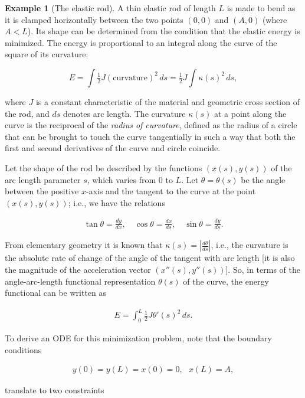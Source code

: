 \documentclass[11pt]{report}
\theoremstyle{plain}
\theoremstyle{definition}
\newtheorem{example}[thm]{Example}
\begin{document}
\begin{example}[The elastic rod]
A thin elastic rod of length $L$ is made to bend as it
is clamped horizontally between the two points $(0,0)$
and $(A,0)$ (where $A<L$). Its shape can be determined
from the condition that the elastic energy is
minimized. The energy is proportional to an integral
along the curve of the square of its curvature:

\[
E = \int \tfrac12 J (\textrm{curvature})^2\,ds = \tfrac12 J \int \kappa(s)^2 \,ds,
\]

\noindent where $J$ is a constant characteristic of the material
and geometric cross section of the rod, and $ds$
denotes arc length. The curvature $\kappa(s)$ at a
point along the curve is the reciprocal of the \emph{radius
of curvature}, defined as the radius of a circle that
can be brought to touch the curve tangentially in such
a way that both the first and second derivatives of
the curve and circle coincide.

Let the shape of the rod be described by the functions
$(x(s), y(s))$ of the arc length parameter $s$, which
varies from $0$ to $L$. Let $\theta=\theta(s)$ be the
angle between the positive $x$-axis and the tangent to
the curve at the point $(x(s),y(s))$; i.e., we have
the relations

\begin{align*}
\tan \theta = \frac{dy}{dx}, \quad \cos\theta = \frac{dx}{ds}, \quad \sin\theta = \frac{dy}{ds}.
\end{align*}

\noindent From elementary geometry it is known that
$\kappa(s) = |\frac{d\theta}{ds}|$, i.e., the
curvature is the absolute rate of change of the angle
of the tangent with arc length [it is also the
magnitude of the acceleration vector
$(x''(s),y''(s))$]. So, in terms of the
angle-arc-length functional representation $\theta(s)$
of the curve, the energy functional can be written as

\begin{align*}
E = \int_0^L \tfrac12 J \theta'(s)^2 \,ds.
\end{align*}

\noindent To derive an ODE for this minimization problem, note
that the boundary conditions

\begin{align*}
y(0) = y(L) = x(0)= 0, \ \ \ x(L)=A,
\end{align*}

\noindent translate to two constraints


\end{example}
\end{document}
